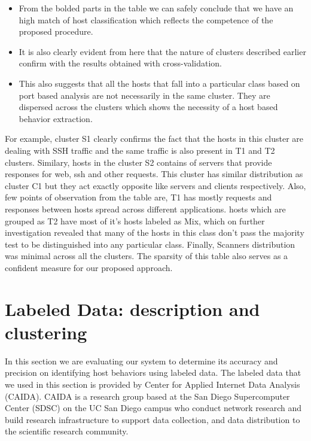 \begin{itemize}
	\item From the bolded parts in the table we can safely conclude that we have an high match of host classification which reflects the competence of the proposed procedure.
	
	\item  It is also clearly evident from here that the nature of clusters described earlier confirm with the results obtained with cross-validation.
	
	\item This also suggests that all the hosts that fall into a particular class based on port based analysis are not necessarily in the same cluster. They are dispersed across the clusters which shows the necessity of a host based behavior extraction.	
\end{itemize}
  For example, cluster S1 clearly confirms the fact that the hosts in this cluster are dealing with SSH traffic and the same traffic is also present in T1 and T2 clusters. Similary, hosts in the cluster S2 contains of servers that provide responses for web, ssh and other requests. This cluster has similar distribution as cluster C1 but they act exactly opposite like servers and clients respectively. Also, few points of observation from the table are, T1 has mostly requests and responses between hosts spread across different applications. hosts which are grouped as T2 have most of it's hosts labeled as Mix, which on further investigation revealed that many of the hosts in this class don't pass the majority test to be distinguished into any particular class. Finally, Scanners distribution was minimal across all the clusters. The sparsity of this table also serves as a confident measure for our proposed approach.

\section{Labeled Data: description and clustering}

In this section we are evaluating our system to determine its accuracy and precision on identifying host behaviors using labeled data. The labeled data that we used in this section is provided by Center for Applied Internet Data Analysis (CAIDA). CAIDA is a research group based at the San Diego Supercomputer Center (SDSC) on the UC San Diego campus who conduct network research and build research infrastructure to support data collection, and data distribution to the scientific research community.

